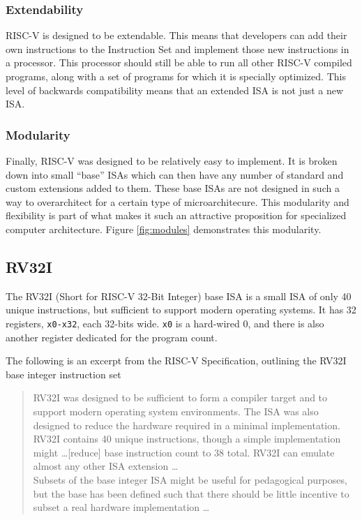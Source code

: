     \subsubsection{Extendability}
        RISC-V is designed to be extendable. This means that developers can add their own instructions to the Instruction Set and implement those new instructions in a processor. This processor should still be able to run all other RISC-V compiled programs, along with a set of programs for which it is specially optimized. This level of backwards compatibility means that an extended ISA is not just a new ISA. 

    \subsubsection{Modularity}
        Finally, RISC-V was designed to be relatively easy to implement. It is broken down into small ``base'' \glspl{ISA} which can then have any number of standard and custom extensions added to them. These base ISAs are not designed in such a way to overarchitect for a certain type of microarchitecure. This modularity and flexibility is part of what makes it such an attractive proposition for specialized computer architecture. Figure \ref{fig:modules} demonstrates this modularity.

        

\subsection{RV32I}
    The RV32I (Short for RISC-V 32-Bit Integer) base \gls{ISA} is a small \gls{ISA} of only 40 unique instructions, but sufficient to support modern operating systems. It has 32 registers, \texttt{x0-x32}, each 32-bits wide. \texttt{x0} is a hard-wired 0, and there is also another register dedicated for the program count. 


    The following is an excerpt from the RISC-V Specification, outlining the RV32I base integer instruction set \cite{Waterman2019}
    \begin{quote}{}
        \small{RV32I was designed to be sufficient to form a compiler target and to support modern operating system environments. The ISA was also designed to reduce the hardware required in a minimal implementation. RV32I contains 40 unique instructions, though a simple implementation might \dots [reduce] base instruction count to 38 total. RV32I can emulate almost any other ISA extension \dots \\
        Subsets of the base integer ISA might be useful for pedagogical purposes, but the base has been defined such that there should be little incentive to subset a real hardware implementation \dots}
    \end{quote}

